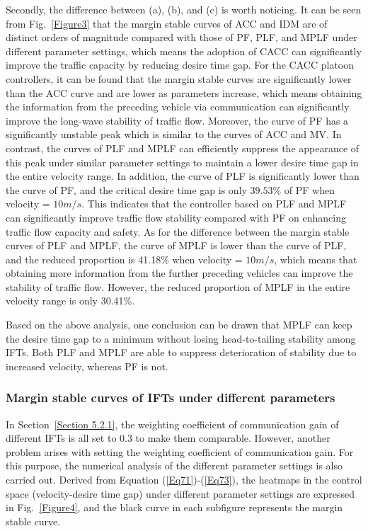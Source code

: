 \documentclass[journal]{IEEEtran}
\begin{document}
Secondly, the difference between (a), (b), and (c) is worth noticing. It can be seen from Fig.~\ref{Figure3} that the margin stable curves of ACC and IDM are of distinct orders of magnitude compared with those of PF, PLF, and MPLF under different parameter settings, which means the adoption of CACC can significantly improve the traffic capacity by reducing desire time gap. For the CACC platoon controllers, it can be found that the margin stable curves are significantly lower than the ACC curve and are lower as parameters increase, which means obtaining the information from the preceding vehicle via communication can significantly improve the long-wave stability of traffic flow. Moreover, the curve of PF has a significantly unstable peak which is similar to the curves of ACC and MV. In contrast, the curves of PLF and MPLF can efficiently suppress the appearance of this peak under similar parameter settings to maintain a lower desire time gap in the entire velocity range. In addition, the curve of PLF is significantly lower than the curve of PF, and the critical desire time gap is only $39.53\%$ of PF when velocity = $10m/s$. This indicates that the controller based on PLF and MPLF can significantly improve traffic flow stability compared with PF on enhancing traffic flow capacity and safety. As for the difference between the margin stable curves of PLF and MPLF, the curve of MPLF is lower than the curve of PLF, and the reduced proportion is 41.18\% when velocity = $10m/s$, which means that obtaining more information from the further preceding vehicles can improve the stability of traffic flow. However, the reduced proportion of MPLF in the entire velocity range is only 30.41\%.

Based on the above analysis, one conclusion can be drawn that MPLF can keep the desire time gap to a minimum without losing head-to-tailing stability among IFTs. Both PLF and MPLF are able to suppress deterioration of stability due to increased velocity, whereas PF is not.



\subsubsection{Margin stable curves of IFTs under different parameters}
\label{Section 5.2.2}
In Section~\ref{Section 5.2.1}, the weighting coefficient of communication gain of different IFTs is all set to 0.3 to make them comparable. However, another problem arises with setting the weighting coefficient of communication gain. For this purpose, the numerical analysis of the different parameter settings is also carried out. Derived from Equation (\ref{Eq71})-(\ref{Eq73}), the heatmaps in the control space (velocity-desire time gap) under different parameter settings are expressed in Fig.~\ref{Figure4}, and the black curve in each subfigure represents the margin stable curve.
\end{document}
